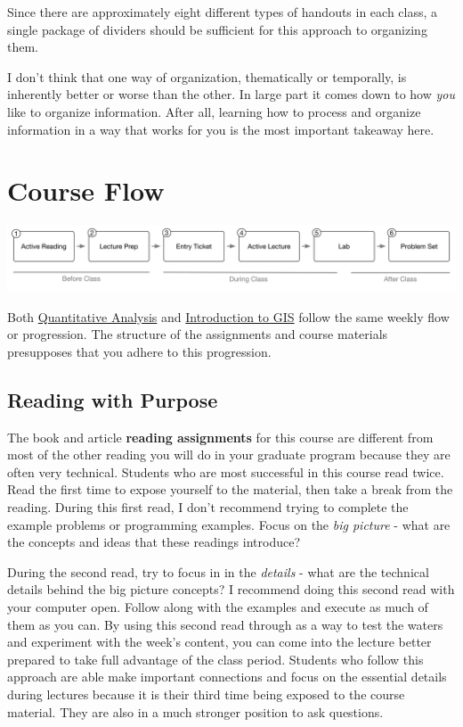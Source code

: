 \documentclass[]{book}
\theoremstyle{definition}
\theoremstyle{definition}
\theoremstyle{definition}
\theoremstyle{remark}
\begin{document}
Since there are approximately eight different types of handouts in each
class, a single package of dividers should be sufficient for this
approach to organizing them.

I don't think that one way of organization, thematically or temporally,
is inherently better or worse than the other. In large part it comes
down to how \emph{you} like to organize information. After all, learning
how to process and organize information in a way that works for you is
the most important takeaway here.

\section{Course Flow}\label{course-flow}

\begin{center}\includegraphics[width=1\linewidth]{images/courseWorkflow} \end{center}

Both \href{https://slu-soc5050.github.io}{Quantitative Analysis} and
\href{https://slu-soc5650.github.io}{Introduction to GIS} follow the
same weekly flow or progression. The structure of the assignments and
course materials presupposes that you adhere to this progression.

\subsection{Reading with Purpose}\label{reading-with-purpose}

The book and article \textbf{reading assignments} for this course are
different from most of the other reading you will do in your graduate
program because they are often very technical. Students who are most
successful in this course read twice. Read the first time to expose
yourself to the material, then take a break from the reading. During
this first read, I don't recommend trying to complete the example
problems or programming examples. Focus on the \emph{big picture} - what
are the concepts and ideas that these readings introduce?

During the second read, try to focus in in the \emph{details} - what are
the technical details behind the big picture concepts? I recommend doing
this second read with your computer open. Follow along with the examples
and execute as much of them as you can. By using this second read
through as a way to test the waters and experiment with the week's
content, you can come into the lecture better prepared to take full
advantage of the class period. Students who follow this approach are
able make important connections and focus on the essential details
during lectures because it is their third time being exposed to the
course material. They are also in a much stronger position to ask
questions.
\end{document}
